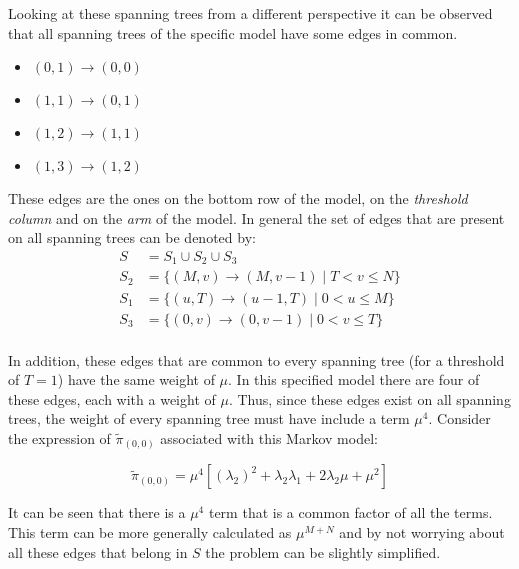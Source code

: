 Looking at these spanning trees from a different perspective it can be observed 
that all spanning trees of the specific model have some edges in common. 

\begin{multicols}{4}
    \begin{itemize}
        \item \((0,1) \rightarrow (0,0)\)
        \item \((1,1) \rightarrow (0,1)\)
        \item \((1,2) \rightarrow (1,1)\)
        \item \((1,3) \rightarrow (1,2)\)
    \end{itemize}
\end{multicols}

These edges are the ones on the bottom row of the model, on the 
\textit{threshold column} and on the \textit{arm} of the model. 
In general the set of edges that are present on all spanning trees can be 
denoted by:
\begin{align} \label{eq:common_edges_set}
    S &= S_1 \cup S_2 \cup S_3 \nonumber\\
    S_2 &= \{(M,v) \rightarrow (M,v-1) \; | \; T < v \leq N\} \nonumber \\
    S_1 &= \{(u,T) \rightarrow (u-1,T) \; | \; 0 < u \leq M\} \nonumber \\
    S_3 &= \{(0,v) \rightarrow (0,v-1) \; | \; 0 < v \leq T\} \nonumber \\
\end{align}

In addition, these edges that are common to every spanning tree (for a threshold 
of \(T=1\)) have the same weight of \(\mu\). 
In this specified model there are four of these edges, each with a weight of 
\(\mu\). 
Thus, since these edges exist on all spanning trees, the weight of every spanning 
tree must have include a term \(\mu^4\). 
Consider the expression of \(\tilde{\pi}_{(0,0)}\) associated with this Markov 
model:

\begin{equation}\label{eq:pi_00_rate_example}
    \tilde{\pi}_{(0,0)} = \mu^4[(\lambda_2)^2 + \lambda_2 \lambda_1 
    + 2\lambda_2 \mu + \mu^2] 
\end{equation}

It can be seen that there is a \(\mu^4\) term that is a common factor of all the
 terms. 
This term can be more generally calculated as \(\mu^{M+N}\) and by not worrying 
about all these edges that belong in \(S\) the problem can be slightly simplified.

